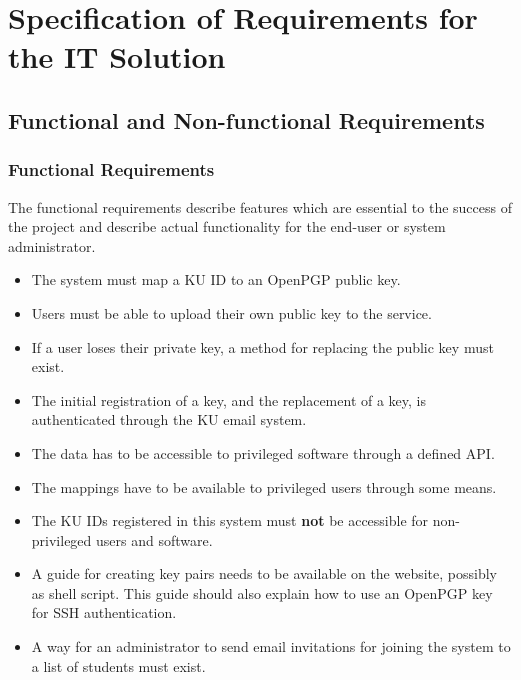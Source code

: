 \documentclass[11pt,a4paper]{report}
\begin{document}
\renewcommand{\thesubsection}{\thesection.\alph{subsection}}
\section{Specification of Requirements for the IT Solution}\label{sec:Requirements}
\subsection{Functional and Non-functional Requirements}
\subsubsection{Functional Requirements}\label{subsubsec:Functional_Req}
The functional requirements describe features which are essential to the success of the project and describe actual functionality for the end-user or system administrator.
\begin{itemize}
\item The system must map a KU ID to an OpenPGP public key.
\item Users must be able to upload their own public key to the service.
\item If a user loses their private key, a method for replacing the public key must exist.
\item The initial registration of a key, and the replacement of a key, is authenticated through the KU email system.
\item The data has to be accessible to privileged software through a defined API.
\item The mappings have to be available to privileged users through some means.
\item The KU IDs registered in this system must \textbf{not} be accessible for non-privileged users and software.
\item A guide for creating key pairs needs to be available on the website, possibly as shell script. This guide should also explain how to use an OpenPGP key for SSH authentication.
\item A way for an administrator to send email invitations for joining the system to a list of students must exist.
\end{itemize}
\end{document}
